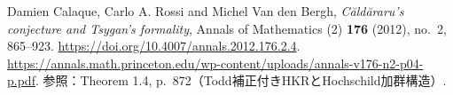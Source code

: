 Damien Calaque, Carlo A. Rossi and Michel Van den Bergh,
\emph{C\u{a}ld\u{a}raru's conjecture and Tsygan's formality},
Annals of Mathematics (2) \textbf{176} (2012), no.~2, 865--923.
\url{https://doi.org/10.4007/annals.2012.176.2.4}.
\url{https://annals.math.princeton.edu/wp-content/uploads/annals-v176-n2-p04-p.pdf}.
参照：Theorem 1.4, p.~872（Todd補正付きHKRとHochschild加群構造）.
